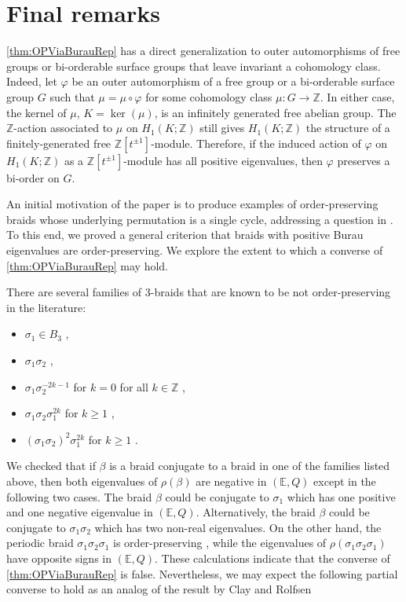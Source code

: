 \documentclass{amsart}
\begin{document}
\section{Final remarks}
\label{subsec:ConjecturesQuestions}

\cref{thm:OPViaBurauRep} has a direct generalization to outer automorphisms of free groups or bi-orderable surface groups that leave invariant a cohomology class. Indeed, let $\varphi$ be an outer automorphism of a free group or a bi-orderable surface group $G$ such that $\mu = \mu \circ \varphi$ for some cohomology class $\mu: G \to \mathbb{Z}$. In either case, the kernel of $\mu$, $K = \ker(\mu)$, is an infinitely generated free abelian group. The $\mathbb{Z}$-action associated to $\mu$ on $H_1(K;\mathbb{Z})$ still gives $H_1(K;\mathbb{Z})$ the structure of a finitely-generated free $\mathbb{Z}[t^{\pm 1}]$-module. Therefore, if the induced action of $\varphi$ on $H_1(K;\mathbb{Z})$ as a $\mathbb{Z}[t^{\pm 1}]$-module has all positive eigenvalues, then $\varphi$ preserves a bi-order on $G$.  

An initial motivation of the paper is to produce examples of order-preserving braids whose underlying permutation is a single cycle, addressing a question in \cite{KinRolfsen18}. To this end, we proved a general criterion that braids with positive Burau eigenvalues are order-preserving. We explore the extent to which a converse of \cref{thm:OPViaBurauRep} may hold.

There are several families of 3-braids that are known to be not order-preserving in the literature:
\begin{itemize}
    \item $\sigma_1 \in B_3$ \cite[Prop 4.4]{KinRolfsen18},
    \item $\sigma_1\sigma_2$ \cite[Theorem 4.10]{KinRolfsen18},
    \item $\sigma_1\sigma_2^{-2k-1}$ for $k=0$ \cite[Theorem 4.12]{KinRolfsen18} for all $k \in \mathbb{Z}$ \cite{JohnsonScherichTurner2024},
    \item $\sigma_1\sigma_2\sigma_1^{2k}$ for $k \geq 1$ \cite[Theorem 6.1]{KinRolfsen18},
    \item $(\sigma_1\sigma_2)^2\sigma_1^{2k}$ for $k \geq 1$ \cite[Theorem 6.3]{KinRolfsen18}.
\end{itemize}

We checked that if $\beta$ is a braid conjugate to a braid in one of the families listed above, then both eigenvalues of $\rho(\beta)$ are negative in $(\mathbb{E},Q)$ except in the following two cases. The braid $\beta$ could be conjugate to $\sigma_1$ which has one positive and one negative eigenvalue in $(\mathbb{E},Q)$. Alternatively, the braid $\beta$ could be conjugate to $\sigma_1\sigma_2$ which has two non-real eigenvalues. On the other hand, the periodic braid $\sigma_1\sigma_2\sigma_1$ is order-preserving \cite[Theorem 4.10]{KinRolfsen18}, while the eigenvalues of $\rho(\sigma_1\sigma_2\sigma_1)$ have opposite signs in $(\mathbb{E},Q)$. These calculations indicate that the converse of \cref{thm:OPViaBurauRep} is false. Nevertheless, we may expect the following partial converse to hold as an analog of the result by Clay and Rolfsen \cite[Theorem 3.4]{ClayRolfsen12}
\end{document}
